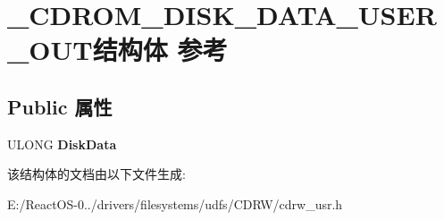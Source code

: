 \hypertarget{struct___c_d_r_o_m___d_i_s_k___d_a_t_a___u_s_e_r___o_u_t}{}\section{\+\_\+\+C\+D\+R\+O\+M\+\_\+\+D\+I\+S\+K\+\_\+\+D\+A\+T\+A\+\_\+\+U\+S\+E\+R\+\_\+\+O\+U\+T结构体 参考}
\label{struct___c_d_r_o_m___d_i_s_k___d_a_t_a___u_s_e_r___o_u_t}
\subsection*{Public 属性}
\begin{DoxyCompactItemize}
\item 
\mbox{\label{struct___c_d_r_o_m___d_i_s_k___d_a_t_a___u_s_e_r___o_u_t_aec9a1c377e29d38bf33f549366dcfd30}} 
U\+L\+O\+NG {\bfseries Disk\+Data}
\end{DoxyCompactItemize}


该结构体的文档由以下文件生成\+:\begin{DoxyCompactItemize}
\item 
E\+:/\+React\+O\+S-\/0../drivers/filesystems/udfs/\+C\+D\+R\+W/cdrw\+\_\+usr.\+h\end{DoxyCompactItemize}
